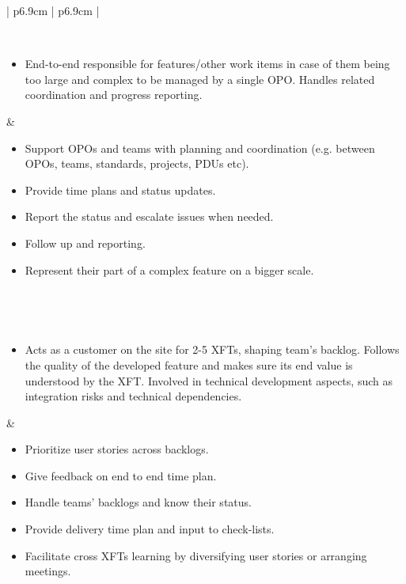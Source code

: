 \begin{table}[h]
   \begin{tabularx}{\textwidth}{ | p{6.9cm} | p{6.9cm} | }
   
   \hline
      
   
   \\ \hline
   
   \begin{itemize}[label={}, leftmargin=*, topsep=0pt, itemsep=0pt, partopsep=0pt]
     \item End-to-end responsible for features/other work items in case of them being too large and complex to be managed by a single \ac{OPO}. Handles related coordination and progress reporting. 
   \end{itemize} & 

   \begin{itemize}[label={}, leftmargin=*, topsep=0pt, itemsep=0pt, partopsep=0pt]
     \item Support \acp{OPO} and teams with planning and coordination (e.g. between OPOs, teams, standards, projects, PDUs etc).
     \item Provide time plans and status updates.
     \item Report the status and escalate issues when needed.
     \item Follow up and reporting.
     \item Represent their part of a complex feature on a bigger scale.
   \end{itemize} 
   
   \\ \hline
   
   
   \\ \hline
   
   \begin{itemize}[label={}, leftmargin=*, topsep=0pt, itemsep=0pt, partopsep=0pt]
     \item Acts as a customer on the site for 2-5 \acp{XFT}, shaping team's backlog. Follows the quality of the developed feature and makes sure its end value is understood by the \ac{XFT}. Involved in technical development aspects, such as integration risks and technical dependencies.
   \end{itemize} & 
   
   \begin{itemize}[label={}, leftmargin=*, topsep=0pt, itemsep=0pt, partopsep=0pt]
     \item Prioritize user stories across backlogs.
     \item Give feedback on end to end time plan.
     \item Handle teams' backlogs and know their status.
     \item Provide delivery time plan and input to check-lists.
     \item Facilitate cross \acp{XFT} learning by diversifying user stories or arranging meetings.
   \end{itemize} 
   

\end{tabularx}
\end{table}
